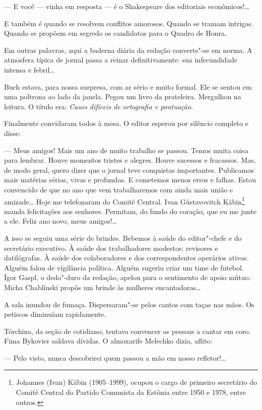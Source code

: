--- E você --- vinha em resposta --- é o Shakespeare dos editoriais
econômicos!\ldots{}

E também é quando se resolvem conflitos amorosos. Quando se tramam
intrigas. Quando se propõem em segredo os candidatos para o Quadro de
Honra.

Em outras palavras, aqui a baderna diária da redação converte"-se em
norma. A atmosfera típica de jornal passa a reinar definitivamente: sua
infecundidade intensa e febril\ldots{}

Buch estava, para nossa surpresa, com ar sério e muito formal. Ele se
sentou em uma poltrona ao lado da janela. Pegou um livro da prateleira.
Mergulhou na leitura. O título era: \emph{Casos difíceis de ortografia e
pontuação}.

Finalmente convidaram todos à mesa. O editor esperou por silêncio
completo e disse:

--- Meus amigos! Mais um ano de muito trabalho se passou. Temos muita
coisa para lembrar. Houve momentos tristes e alegres. Houve sucessos e
fracassos. Mas, de modo geral, quero dizer que o jornal teve conquistas
importantes. Publicamos mais matérias sérias, vivas e profundas. E
cometemos menos erros e falhas. Estou convencido de que no ano que vem
trabalharemos com ainda mais união e amizade\ldots{} Hoje me telefonaram do
Comitê Central. Ivan Gústavovitch Käbin\footnote{Johannes (Ivan) Käbin
  (1905--1999), ocupou o cargo de primeiro secretário do Comitê Central
  do Partido Comunista da Estônia entre 1950 e 1978, entre outros.}
manda felicitações aos senhores. Permitam, do fundo do coração, que eu
me junte a ele. Feliz ano novo, meus amigos!\ldots{}

A isso se seguiu uma série de brindes. Bebemos à saúde do editor"-chefe e
do secretário executivo. À saúde dos trabalhadores modestos: revisores e
datilógrafas. À saúde dos colaboradores e dos correspondentes operários
ativos. Alguém falou de vigilância política. Alguém sugeriu criar um
time de futebol. Ígor Gaspl, o dedo"-duro da redação, apelou para o
sentimento de apoio mútuo. Micha Chablínski propôs um brinde às mulheres
encantadoras\ldots{}

A sala inundou de fumaça. Dispersaram"-se pelos cantos com taças nas
mãos. Os petiscos diminuíam rapidamente.

Tórchina, da seção de cotidiano, tentava convencer as pessoas a cantar
em coro. Fima Bykovier saldava dívidas. O almoxarife Melechko dizia,
aflito:

--- Pelo visto, nunca descobrirei quem passou a mão em nosso
refletor!\ldots{}

